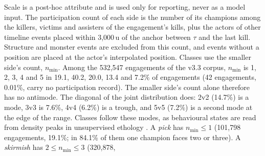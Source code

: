 Scale is a post-hoc attribute and is used only for reporting, never as a model input. The participation
count of each side is the number of its champions among the killers, victims and assisters of the
engagement's kills, plus the actors of other timeline events placed within 3,000\,u of the anchor
between $\tau$ and the last kill. Structure and monster events are excluded from this count, and events
without a position are placed at the actor's interpolated position.
Classes use the smaller side's count, $n_{\min}$. Among the 532,547 engagements of the v3.3 corpus,
$n_{\min}$ is 1, 2, 3, 4 and 5 in 19.1, 40.2, 20.0, 13.4 and 7.2\% of engagements (42 engagements, 0.01\%,
carry no participation record). The smaller side's count alone therefore has no antimode. The diagonal
of the joint distribution does: 2v2 (14.7\%) is a mode, 3v3 is 7.6\%, 4v4 (6.2\%) is a trough, and 5v5
(7.2\%) is a second mode at the edge of the range.
Classes follow these modes, as behavioural states are read from density peaks in unsupervised ethology
\cite{berman2014mapping}. A \emph{pick} has $n_{\min} \leq 1$ (101,798 engagements, 19.1\%; in 84.1\% of
them one champion faces two or three). A \emph{skirmish} has $2 \leq n_{\min} \leq 3$ (320,878,
